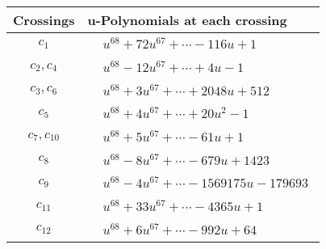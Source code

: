 \documentclass[1p]{elsarticle_modified}
\theoremstyle{definition}
\begin{document}
\begin{tabular}{m{50pt}|m{274pt}}
Crossings & \hspace{64pt}u-Polynomials at each crossing \\
\hline $$\begin{aligned}c_{1}\end{aligned}$$&$\begin{aligned}
&u^{68}+72 u^{67}+\cdots-116 u+1
\end{aligned}$\\
\hline $$\begin{aligned}c_{2},c_{4}\end{aligned}$$&$\begin{aligned}
&u^{68}-12 u^{67}+\cdots+4 u-1
\end{aligned}$\\
\hline $$\begin{aligned}c_{3},c_{6}\end{aligned}$$&$\begin{aligned}
&u^{68}+3 u^{67}+\cdots+2048 u+512
\end{aligned}$\\
\hline $$\begin{aligned}c_{5}\end{aligned}$$&$\begin{aligned}
&u^{68}+4 u^{67}+\cdots+20 u^2-1
\end{aligned}$\\
\hline $$\begin{aligned}c_{7},c_{10}\end{aligned}$$&$\begin{aligned}
&u^{68}+5 u^{67}+\cdots-61 u+1
\end{aligned}$\\
\hline $$\begin{aligned}c_{8}\end{aligned}$$&$\begin{aligned}
&u^{68}-8 u^{67}+\cdots-679 u+1423
\end{aligned}$\\
\hline $$\begin{aligned}c_{9}\end{aligned}$$&$\begin{aligned}
&u^{68}-4 u^{67}+\cdots-1569175 u-179693
\end{aligned}$\\
\hline $$\begin{aligned}c_{11}\end{aligned}$$&$\begin{aligned}
&u^{68}+33 u^{67}+\cdots-4365 u+1
\end{aligned}$\\
\hline $$\begin{aligned}c_{12}\end{aligned}$$&$\begin{aligned}
&u^{68}+6 u^{67}+\cdots-992 u+64
\end{aligned}$\\
\hline
\end{tabular}\\~\\
\end{document}
